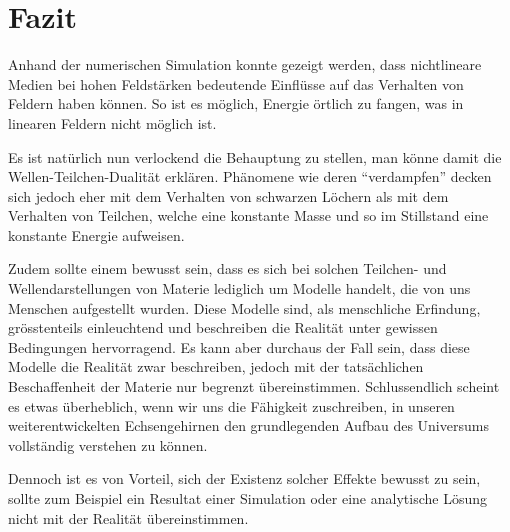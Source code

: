 %
%
%
%
\section{Fazit\label{particles:section:fazit}}

Anhand der numerischen Simulation konnte gezeigt werden, dass nichtlineare Medien bei hohen Feldstärken bedeutende Einflüsse auf das Verhalten von Feldern haben können.
So ist es möglich, Energie örtlich zu fangen, was in linearen Feldern nicht möglich ist.

Es ist natürlich nun verlockend die Behauptung zu stellen, man könne damit die Wellen-Teilchen-Dualität erklären.
Phänomene wie deren ``verdampfen'' decken sich jedoch eher mit dem Verhalten von schwarzen Löchern als mit dem Verhalten von Teilchen, welche eine konstante Masse und so im Stillstand eine konstante Energie aufweisen.

Zudem sollte einem bewusst sein, dass es sich bei solchen Teilchen- und Wellendarstellungen von Materie lediglich um Modelle handelt, die von uns Menschen aufgestellt wurden.
Diese Modelle sind, als menschliche Erfindung, grösstenteils einleuchtend und beschreiben die Realität unter gewissen Bedingungen hervorragend.
Es kann aber durchaus der Fall sein, dass diese Modelle die Realität zwar beschreiben, jedoch mit der tatsächlichen Beschaffenheit der Materie nur begrenzt übereinstimmen.
Schlussendlich scheint es etwas überheblich, wenn wir uns die Fähigkeit zuschreiben, in unseren weiterentwickelten Echsengehirnen den grundlegenden Aufbau des Universums vollständig verstehen zu können.

Dennoch ist es von Vorteil, sich der Existenz solcher Effekte bewusst zu sein, sollte zum Beispiel ein Resultat einer Simulation oder eine analytische Lösung nicht mit der Realität übereinstimmen.
